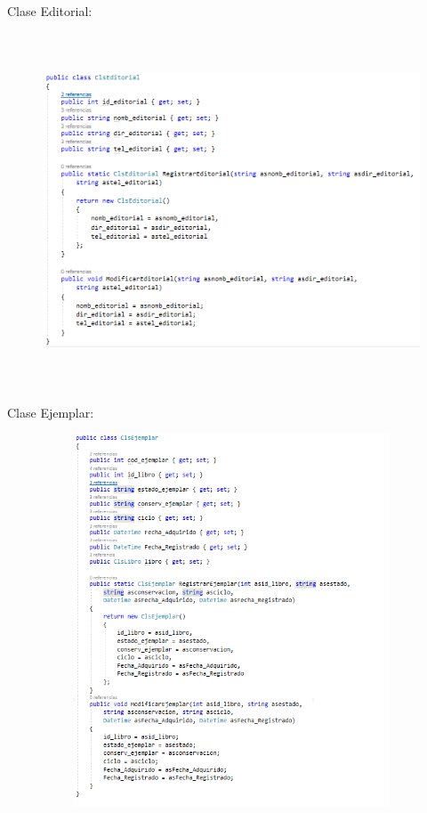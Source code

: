 \documentclass[12pt]{article}
\begin{document}
\begin{enumerate}[label*=\arabic*.]
\begin{enumerate}[label*=\arabic*.]
\newpage
Clase Editorial:
\begin{figure}[H]
	\begin{Center}
		\includegraphics[width=4.91in,height=4.15in]{./media/4.png}
	\end{Center}
\end{figure}


Clase Ejemplar:
\begin{figure}[H]
	\begin{Center}
		\includegraphics[width=4.91in,height=4.35in]{./media/5.png}
	\end{Center}
\end{figure}



\end{enumerate}
\end{enumerate}
\end{document}
